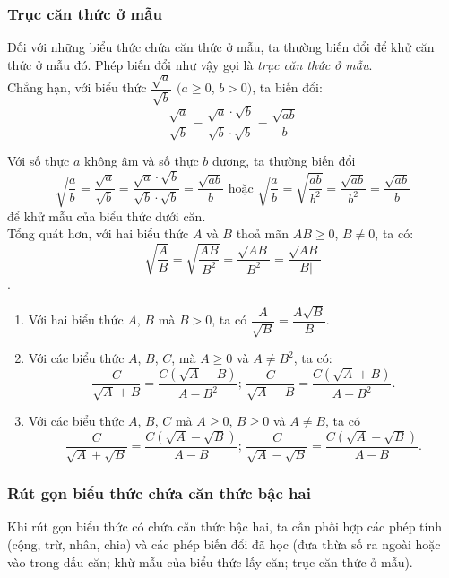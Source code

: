 \begin{tomtat}
\subsubsection{Trục căn thức ở mẫu}
\begin{boxdn}
	Đối với những biểu thức chứa căn thức ở mẫu, ta thường biến đổi để khử căn thức ở mẫu đó. Phép biến đổi như vậy gọi là \textit{trục căn thức ở mẫu}.\\
	Chẳng hạn, với biểu thức $\dfrac{\sqrt{a}}{\sqrt{b}}$ $(a\geq 0$, $b>0)$, ta biến đổi:\\
	\[\dfrac{\sqrt{a}}{\sqrt{b}}=\dfrac{\sqrt{a} \cdot \sqrt{b}}{\sqrt{b} \cdot \sqrt{b}}= \dfrac{\sqrt{ab}}{b}\]
\end{boxdn}
\begin{note}
	Với số thực $a$ không âm và số thực $b$ dương, ta thường biến đổi\\
	\[\sqrt{\dfrac{a}{b}}=\dfrac{\sqrt{a}}{\sqrt{b}}= \dfrac{\sqrt{a} \cdot \sqrt{b}}{\sqrt{b} \cdot \sqrt{b}}= \dfrac{\sqrt{ab}}{b} \text{ hoặc } \sqrt{\dfrac{a}{b}}=\sqrt{\dfrac{ab}{b^2}} = \dfrac{\sqrt{ab}}{b^2}=\dfrac{\sqrt{ab}}{b} \]
	để khử mẫu của biểu thức dưới căn.\\
	Tổng quát hơn, với hai biểu thức $A$ và $B$ thoả mãn $AB\geq 0$, $B \neq 0$, ta có:\\
	\[\sqrt{\dfrac{A}{B}}=\sqrt{\dfrac{AB}{B^2}} = \dfrac{\sqrt{AB}}{B^2}=\dfrac{\sqrt{AB}}{|B|} \].
\end{note}
\begin{note}
	\begin{enumerate}[\bf ---]
	\item Với hai biểu thức $A$, $B$ mà $B>0$, ta có $\dfrac{A}{\sqrt{B}} = \dfrac{A\sqrt{B}}{B}$.
	\item Với các biểu thức $A$, $B$, $C$, mà $A \geq 0$ và $A \neq B^2$, ta có:\\
	\[\dfrac{C}{\sqrt{A} + B} = \dfrac{C(\sqrt{A}-B)}{A-B^2} \text{; } \dfrac{C}{\sqrt{A} - B} = \dfrac{C(\sqrt{A}+B)}{A-B^2}.\]
	\item Với các biểu thức $A$, $B$, $C$ mà $A\geq 0$, $B\geq 0$ và $A\neq B$, ta có\\
	\[\dfrac{C}{\sqrt{A} + \sqrt{B}} = \dfrac{C(\sqrt{A}-\sqrt{B})}{A-B} \text{; }\dfrac{C}{\sqrt{A} - \sqrt{B}} = \dfrac{C(\sqrt{A}+\sqrt{B})}{A-B}. \]
	\end{enumerate}
\end{note}
\subsubsection{Rút gọn biểu thức chứa căn thức bậc hai}
\begin{boxdn}
	Khi rút gọn biểu thức có chứa căn thức bậc hai, ta cần phối hợp các phép tính (cộng, trừ, nhân, chia) và các phép biến đổi đã học (đưa thừa số ra ngoài hoặc vào trong dấu căn; khừ mẫu của biểu thức lấy căn; trục căn thức ở mẫu).
\end{boxdn}
\end{tomtat}
